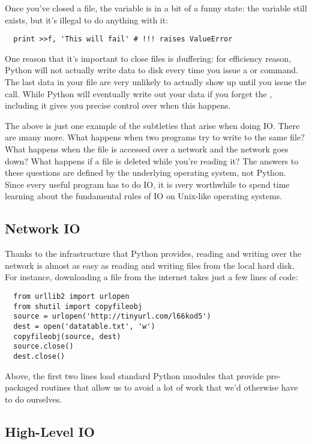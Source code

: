\documentclass[letterpaper, 12pt, titlepage, twoside]{article}
\begin{document}
Once you've closed a file, the  variable is in a bit of a funny state:
the variable still exists, but it's illegal to do anything with it:

\begin{lstlisting}
  print >>f, 'This will fail' # !!! raises ValueError
\end{lstlisting}

One reason that it's important to close files is \i{buffering}: for efficiency
reason, Python will not actually write data to disk every time you issue a
 or  command. The last data in your file are very unlikely
to actually show up until you issue the  call. While Python will
eventually write out your data if you forget the , including it
gives you precise control over when this happens.

The above is just one example of the subtleties that arise when doing IO.
There are \i{many} more. What happens when two programs try to write to the
same file? What happens when the file is accessed over a network and the
network goes down? What happens if a file is deleted while you're reading it?
The answers to these questions are defined by the underlying operating system,
not Python. Since every useful program has to do IO, it is \i{very} worthwhile
to spend time learning about the fundamental rules of IO on Unix-like
operating systems.

\subsection*{Network IO}

Thanks to the infrastructure that Python provides, reading and writing over
the network is almost as easy as reading and writing files from the local hard
disk. For instance, downloading a file from the internet takes just a few
lines of code:

\begin{lstlisting}
  from urllib2 import urlopen
  from shutil import copyfileobj
  source = urlopen('http://tinyurl.com/l66kod5')
  dest = open('datatable.txt', 'w')
  copyfileobj(source, dest)
  source.close()
  dest.close()
\end{lstlisting}

Above, the first two lines load standard Python \i{modules} that provide
pre-packaged routines that allow us to avoid a lot of work that we'd otherwise
have to do ourselves.

\subsection*{High-Level IO}
\end{document}
